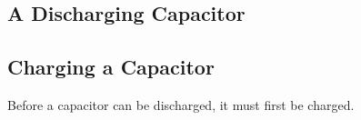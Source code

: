 %    
%
%
%
%
\subsection{A Discharging Capacitor}
%
%  
%
%
%
%
%
\subsection{Charging a Capacitor}
Before a capacitor can be discharged, it must first be charged.

